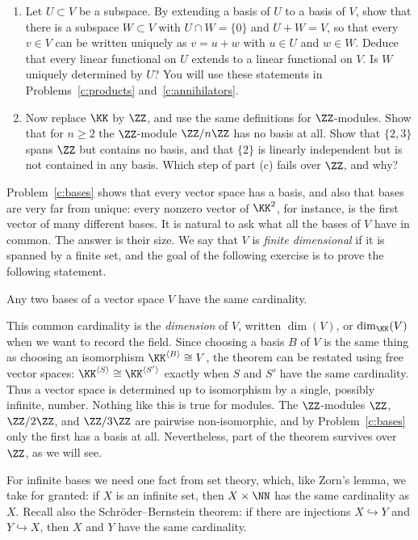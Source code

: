 \documentclass[12pt,reqno]{amsart}
\begin{document}
\begin{problems}
\begin{enumerate}
\item Let $U\subset V$ be a subspace. By extending a basis of $U$ to a basis of $V$, show that there is a subspace $W\subset V$ with $U\cap W=\{0\}$ and $U+W=V$, so that every $v\in V$ can be written uniquely as $v=u+w$ with $u\in U$ and $w\in W$. Deduce that every linear functional on $U$ extends to a linear functional on $V$. Is $W$ uniquely determined by $U$? You will use these statements in Problems~\ref{c:products} and~\ref{c:annihilators}.
\item Now replace $\KK$ by $\ZZ$, and use the same definitions for $\ZZ$-modules. Show that for $n\geq2$ the $\ZZ$-module $\ZZ/n\ZZ$ has no basis at all. Show that $\{2,3\}$ spans $\ZZ$ but contains no basis, and that $\{2\}$ is linearly independent but is not contained in any basis. Which step of part (c) fails over $\ZZ$, and why?
\end{enumerate}
\end{problems}

\hrulefill

Problem~\ref{c:bases} shows that every vector space has a basis, and also that bases are very far from unique: every nonzero vector of $\KK^2$, for instance, is the first vector of many different bases. It is natural to ask what all the bases of $V$ have in common. The answer is their size. We say that $V$ is \emph{finite dimensional} if it is spanned by a finite set, and the goal of the following exercise is to prove the following statement.

\begin{theorem}
Any two bases of a vector space $V$ have the same cardinality.
\end{theorem}

This common cardinality is the \emph{dimension} of $V$, written $\dim(V)$, or $\dim_{\KK}(V)$ when we want to record the field. Since choosing a basis $B$ of $V$ is the same thing as choosing an isomorphism $\KK^{\langle B\rangle}\cong V$, the theorem can be restated using free vector spaces: $\KK^{\langle S\rangle}\cong\KK^{\langle S'\rangle}$ exactly when $S$ and $S'$ have the same cardinality. Thus a vector space is determined up to isomorphism by a single, possibly infinite, number. Nothing like this is true for modules. The $\ZZ$-modules $\ZZ$, $\ZZ/2\ZZ$, and $\ZZ/3\ZZ$ are pairwise non-isomorphic, and by Problem~\ref{c:bases} only the first has a basis at all. Nevertheless, part of the theorem survives over $\ZZ$, as we will see.

For infinite bases we need one fact from set theory, which, like Zorn's lemma, we take for granted: if $X$ is an infinite set, then $X\times\NN$ has the same cardinality as $X$. Recall also the Schr\"oder--Bernstein theorem: if there are injections $X\hookrightarrow Y$ and $Y\hookrightarrow X$, then $X$ and $Y$ have the same cardinality.
\end{document}
